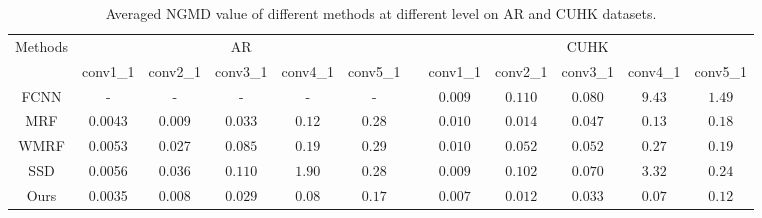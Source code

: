 \documentclass[10pt,twocolumn,letterpaper]{article}
\begin{document}
\begin{table}[htbp]
\begin{center}
{\small
\begin{tabular}{ccccccccccccc}
\hline
\multicolumn{2}{c|}{\multirow {2}{*}{Methods}} &\multicolumn{5}{c}{AR} & & \multicolumn{5}{c}{CUHK} \\
\cline{3-7} \cline{9-13} \multicolumn{2}{c|}{} & conv1\_1 & conv2\_1 & conv3\_1 & conv4\_1 & conv5\_1 & &
 conv1\_1 & conv2\_1 & conv3\_1 & conv4\_1 & conv5\_1  \\
\hline
\multicolumn{2}{c|}{FCNN} & - & - & - & - & - & & { $0.009$} &{ $0.110$} & {$0.080$} & {$9.43$} & {$1.49$}  \\
\multicolumn{2}{c|}{MRF} & 0.0043 & 0.009 & {$0.033$}  & {$0.12$} & 0.28 & & { $0.010$} &{ $0.014$} & {$0.047$} & $0.13$ & $0.18$  \\
\multicolumn{2}{c|}{WMRF} & 0.0053 & 0.027 & {$0.085$}  & {$0.19$} & 0.29 & & { $0.010$} &{ $0.052$} & {$0.052$} & {$0.27$} & {$0.19$}  \\
\multicolumn{2}{c|}{SSD} & 0.0056 & 0.036 & {$0.110$} & {$1.90$} & 0.28 & & { $0.009$} &{ $0.102$} & {$0.070$} & {$3.32$} & {$0.24$}  \\
\multicolumn{2}{c|}{Ours} & {\color{red} 0.0035} & {\color{red} 0.008} & {\color{red} $0.029$} & {\color{red} $0.08$} & {\color{red} $0.17$} & & {\color{red}$0.007$} &{\color{red} $0.012$} & {\color{red} $0.033$} & {\color{red} $0.07$} & {\color{red} $0.12$}  \\
\hline
\end{tabular}
}
\end{center}
\caption{Averaged NGMD value of different methods at different level on AR and CUHK datasets.}
\label{tab:NGMD}
\end{table}

\end{document}

